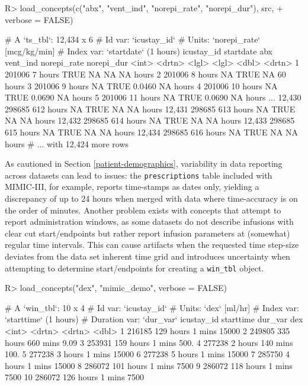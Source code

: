 \documentclass[
  notitle]{jss}
\begin{document}
\begin{CodeChunk}
\begin{CodeInput}
R> load_concepts(c("abx", "vent_ind", "norepi_rate", "norepi_dur"), src,
+               verbose = FALSE)
\end{CodeInput}
\begin{CodeOutput}
# A `ts_tbl`: 12,434 x 6
# Id var:     `icustay_id`
# Units:      `norepi_rate` [mcg/kg/min]
# Index var:  `startdate` (1 hours)
       icustay_id startdate abx   vent_ind norepi_rate norepi_dur
            <int> <drtn>    <lgl> <lgl>          <dbl> <drtn>
     1     201006   7 hours TRUE  NA           NA      NA hours
     2     201006   8 hours NA    TRUE         NA      60 hours
     3     201006   9 hours NA    TRUE          0.0460 NA hours
     4     201006  10 hours NA    TRUE          0.0690 NA hours
     5     201006  11 hours NA    TRUE          0.0690 NA hours
   ...
12,430     298685 612 hours NA    TRUE         NA      NA hours
12,431     298685 613 hours NA    TRUE         NA      NA hours
12,432     298685 614 hours NA    TRUE         NA      NA hours
12,433     298685 615 hours NA    TRUE         NA      NA hours
12,434     298685 616 hours NA    TRUE         NA      NA hours
# ... with 12,424 more rows
\end{CodeOutput}
\end{CodeChunk}

As cautioned in Section \ref{patient-demographics}, variability in data
reporting across datasets can lead to issues: the \texttt{prescriptions}
table included with MIMIC-III, for example, reports time-stamps as dates
only, yielding a discrepancy of up to 24 hours when merged with data
where time-accuracy is on the order of minutes. Another problem exists
with concepts that attempt to report administration windows, as some
datasets do not describe infusions with clear cut start/endpoints but
rather report infusion parameters at (somewhat) regular time intervals.
This can cause artifacts when the requested time step-size deviates from
the data set inherent time grid and introduces uncertainty when
attempting to determine start/endpoints for creating a \texttt{win\_tbl}
object.

\begin{CodeChunk}
\begin{CodeInput}
R> load_concepts("dex", "mimic_demo", verbose = FALSE)
\end{CodeInput}
\begin{CodeOutput}
# A `win_tbl`:  10 x 4
# Id var:       `icustay_id`
# Units:        `dex` [ml/hr]
# Index var:    `starttime` (1 hours)
# Duration var: `dur_var`
   icustay_id starttime dur_var       dex
        <int> <drtn>    <drtn>      <dbl>
 1     216185 129 hours   1 mins 15000
 2     249805 335 hours 660 mins     9.09
 3     253931 159 hours   1 mins   500.
 4     277238   2 hours 140 mins   100.
 5     277238   3 hours   1 mins 15000
 6     277238   5 hours   1 mins 15000
 7     285750   4 hours   1 mins 15000
 8     286072 101 hours   1 mins  7500
 9     286072 118 hours   1 mins  7500
10     286072 126 hours   1 mins  7500
\end{CodeOutput}
\end{CodeChunk}
\end{document}
